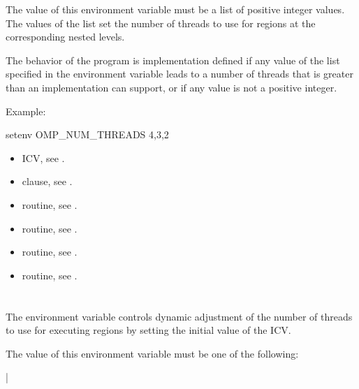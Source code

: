 The value of this environment variable must be a list of positive integer 
values. The values of the list set the number of threads to use for 
 regions at the corresponding nested levels.

The behavior of the program is implementation defined if any value of the 
list specified in the  environment variable leads to 
a number of threads that is greater than an implementation can support, or 
if any value is not a positive integer.

Example:
\begin{ompEnv}
setenv OMP_NUM_THREADS 4,3,2
\end{ompEnv}

\crossreferences
\begin{itemize}
\item {} ICV, see .

\item {} clause, see .

\item {} routine, see .

\item {} routine, see .

\item {} routine, see .

\item {} routine, see .
\end{itemize}



\section{}
\label{sec:OMP_DYNAMIC}
The  environment variable controls dynamic adjustment 
of the number of threads to use for executing  regions by 
setting the initial value of the  ICV. 

The value of this environment variable must be one of the following:

{|} 

